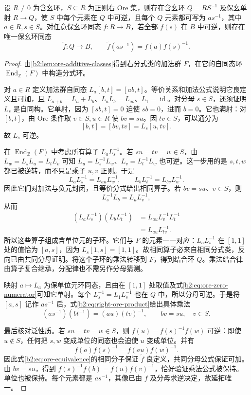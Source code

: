 \begin{theorem}\label{b2:thm:right-ore-localization}
	设 \(R\ne0\) 为含幺环，\(S\subseteq R\) 为正则右 Ore 集，则存在含幺环 \(Q=RS^{-1}\) 及保幺单射 \(R\rightarrow Q\)，使 \(S\) 中每个元素在 \(Q\) 中可逆，且每个 \(Q\) 元素都可写为 \(as^{-1}\)，其中 \(a\in R,s\in S\)。对任意保幺环同态 \(f:R\rightarrow B\)，若全部 \(f(s)\) 在 \(B\) 中可逆，则存在唯一保幺环同态
	\[
		\widetilde f:Q\longrightarrow B,\qquad \widetilde f(as^{-1})=f(a)f(s)^{-1}.
	\]
\end{theorem}
\begin{proof}
	由\cref{b2:lem:ore-additive-classes}得到右分式类的加法群 \(F\)，在它的自同态环 \(\operatorname{End}_{\mathbb Z}(F)\) 中构造分式环。

	对 \(a\in R\) 定义加法群自同态 \(L_a[b,t]=[ab,t]\)。等价关系和加法公式说明它良定义且可加，且 \(L_{a+b}=L_a+L_b\)、\(L_aL_b=L_{ab}\)、\(L_1=\operatorname{id}\)。对分母 \(s\in S\)，还须证明 \(L_s\) 是自同构。它单射，因为 \([sb,t]=0\) 迫使 \(sb=0\)，进而 \(b=0\)。它也满射：对 \([b,t]\)，由 Ore 条件取 \(v\in S,u\in R\) 使 \(bv=su\)。因 \(tv\in S\)，可以通分为
	\[
		[b,t]=[bv,tv]=L_s[u,tv].
	\]
	故 \(L_s\) 可逆。

	在 \(\operatorname{End}_{\mathbb Z}(F)\) 中考虑所有算子 \(L_aL_s^{-1}\)。若 \(su=tv=w\in S\)，由 \(L_w=L_sL_u=L_tL_v\) 可知 \(L_u=L_s^{-1}L_w\)、\(L_v=L_t^{-1}L_w\) 也可逆。这一步用的是 \(s,t,w\) 都已被逆转，而不只是乘子 \(u,v\) 正则。于是
	\[
		L_aL_s^{-1}=L_{au}L_w^{-1},\qquad L_bL_t^{-1}=L_{bv}L_w^{-1}.
	\]
	因此它们对加法与负元封闭，且等价分式给出相同算子。若 \(bv=su\)、\(v\in S\)，则
	\[
		L_s^{-1}L_b=L_uL_v^{-1},
	\]
	从而
	\begin{equation}\label{b2:eq:right-ore-product}
		\begin{aligned}
			(L_aL_s^{-1})(L_bL_t^{-1}) &=L_{au}L_v^{-1}L_t^{-1}\\
			&=L_{au}L_{tv}^{-1}.
		\end{aligned}
	\end{equation}
	所以这些算子组成含单位元的子环。它们与 \(F\) 的元素一一对应：\(L_aL_s^{-1}\) 在 \([1,1]\) 处的值恰为 \([a,s]\)，因为 \(L_s[1,s]=[1,1]\)。故相同算子必来自相同分式类，反向已由共同分母证明。将这个子环的乘法转移到 \(F\)，得到结合环 \(Q\)。乘法结合律由算子复合继承，分配律也不需另作分母猜测。

	映射 \(a\mapsto L_a\) 为保单位元环同态，且由在 \([1,1]\) 处取值及式\eqref{b2:eq:ore-zero-numerator}可知它单射。每个 \(L_s^{-1}=L_1L_s^{-1}\) 也在 \(Q\) 中，所以分母可逆。于是将 \([a,s]\) 记作 \(as^{-1}\) 后，式\eqref{b2:eq:right-ore-product}给出具体乘法
	\[
		(as^{-1})(bt^{-1})=(au)(tv)^{-1}, \qquad bv=su,\quad v\in S.
	\]

	最后核对泛性质。若 \(su=tv=w\in S\)，则 \(f(u)=f(s)^{-1}f(w)\) 可逆：即使 \(u\notin S\)，任何把 \(s,w\) 变成单位的同态也会迫使 \(u\) 变成单位。并有
	\[
		f(a)f(s)^{-1}=f(au)f(w)^{-1}.
	\]
	因此式\eqref{b2:eq:ore-equivalence}的相同分子保证 \(\widetilde f\) 良定义，共同分母公式保证可加。由 \(bv=su\)，得到 \(f(s)^{-1}f(b)=f(u)f(v)^{-1}\)，恰好验证乘法公式被保持。单位也被保持。每个元素都是 \(as^{-1}\)，其像已由 \(f\) 及分母求逆决定，故延拓唯一。
\end{proof}


